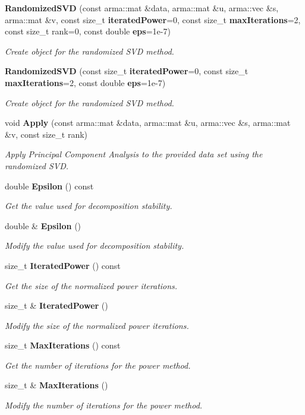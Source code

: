 \begin{DoxyCompactItemize}
\item 
{\bf Randomized\+S\+VD} (const arma\+::mat \&data, arma\+::mat \&u, arma\+::vec \&s, arma\+::mat \&v, const size\+\_\+t {\bf iterated\+Power}=0, const size\+\_\+t {\bf max\+Iterations}=2, const size\+\_\+t rank=0, const double {\bf eps}=1e-\/7)
\begin{DoxyCompactList}\small\item\em Create object for the randomized S\+VD method. \end{DoxyCompactList}\item 
{\bf Randomized\+S\+VD} (const size\+\_\+t {\bf iterated\+Power}=0, const size\+\_\+t {\bf max\+Iterations}=2, const double {\bf eps}=1e-\/7)
\begin{DoxyCompactList}\small\item\em Create object for the randomized S\+VD method. \end{DoxyCompactList}\item 
void {\bf Apply} (const arma\+::mat \&data, arma\+::mat \&u, arma\+::vec \&s, arma\+::mat \&v, const size\+\_\+t rank)
\begin{DoxyCompactList}\small\item\em Apply Principal Component Analysis to the provided data set using the randomized S\+VD. \end{DoxyCompactList}\item 
double {\bf Epsilon} () const 
\begin{DoxyCompactList}\small\item\em Get the value used for decomposition stability. \end{DoxyCompactList}\item 
double \& {\bf Epsilon} ()
\begin{DoxyCompactList}\small\item\em Modify the value used for decomposition stability. \end{DoxyCompactList}\item 
size\+\_\+t {\bf Iterated\+Power} () const 
\begin{DoxyCompactList}\small\item\em Get the size of the normalized power iterations. \end{DoxyCompactList}\item 
size\+\_\+t \& {\bf Iterated\+Power} ()
\begin{DoxyCompactList}\small\item\em Modify the size of the normalized power iterations. \end{DoxyCompactList}\item 
size\+\_\+t {\bf Max\+Iterations} () const 
\begin{DoxyCompactList}\small\item\em Get the number of iterations for the power method. \end{DoxyCompactList}\item 
size\+\_\+t \& {\bf Max\+Iterations} ()
\begin{DoxyCompactList}\small\item\em Modify the number of iterations for the power method. \end{DoxyCompactList}\end{DoxyCompactItemize}
